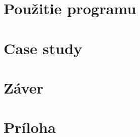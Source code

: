 \documentclass[11pt,final,oneside]{fithesis}
\begin{document}
\chapter{Pou\v zitie programu}

\chapter{Case study}

\chapter{Z\' aver}


 


\chapter*{Pr\' iloha}
\end{document}

